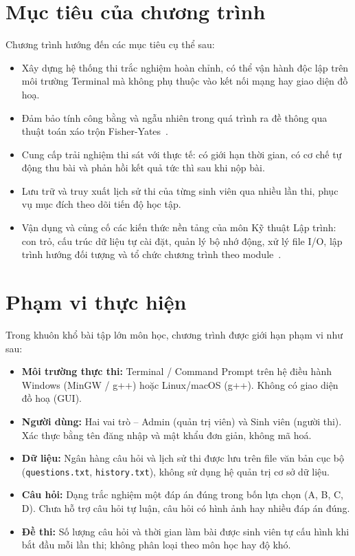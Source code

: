 \documentclass[11pt]{report}
\begin{document}
\section{Mục tiêu của chương trình}

Chương trình hướng đến các mục tiêu cụ thể sau:

\begin{itemize}[leftmargin=*]
    \item Xây dựng hệ thống thi trắc nghiệm hoàn chỉnh, có thể vận hành độc lập trên môi trường Terminal mà không phụ thuộc vào kết nối mạng hay giao diện đồ hoạ.
    \item Đảm bảo tính công bằng và ngẫu nhiên trong quá trình ra đề thông qua thuật toán xáo trộn Fisher-Yates~\cite{knuth1997}.
    \item Cung cấp trải nghiệm thi sát với thực tế: có giới hạn thời gian, có cơ chế tự động thu bài và phản hồi kết quả tức thì sau khi nộp bài.
    \item Lưu trữ và truy xuất lịch sử thi của từng sinh viên qua nhiều lần thi, phục vụ mục đích theo dõi tiến độ học tập.
    \item Vận dụng và củng cố các kiến thức nền tảng của môn Kỹ thuật Lập trình: con trỏ, cấu trúc dữ liệu tự cài đặt, quản lý bộ nhớ động, xử lý file I/O, lập trình hướng đối tượng và tổ chức chương trình theo module~\cite{nam2022}.
\end{itemize}

\section{Phạm vi thực hiện}

Trong khuôn khổ bài tập lớn môn học, chương trình được giới hạn phạm vi như sau:

\begin{itemize}[leftmargin=*]
    \item \textbf{Môi trường thực thi:} Terminal / Command Prompt trên hệ điều hành Windows (MinGW / g++) hoặc Linux/macOS (g++). Không có giao diện đồ hoạ (GUI).
    \item \textbf{Người dùng:} Hai vai trò -- Admin (quản trị viên) và Sinh viên (người thi). Xác thực bằng tên đăng nhập và mật khẩu đơn giản, không mã hoá.
    \item \textbf{Dữ liệu:} Ngân hàng câu hỏi và lịch sử thi được lưu trên file văn bản cục bộ (\texttt{questions.txt}, \texttt{history.txt}), không sử dụng hệ quản trị cơ sở dữ liệu.
    \item \textbf{Câu hỏi:} Dạng trắc nghiệm một đáp án đúng trong bốn lựa chọn (A, B, C, D). Chưa hỗ trợ câu hỏi tự luận, câu hỏi có hình ảnh hay nhiều đáp án đúng.
    \item \textbf{Đề thi:} Số lượng câu hỏi và thời gian làm bài được sinh viên tự cấu hình khi bắt đầu mỗi lần thi; không phân loại theo môn học hay độ khó.
\end{itemize}
\end{document}
